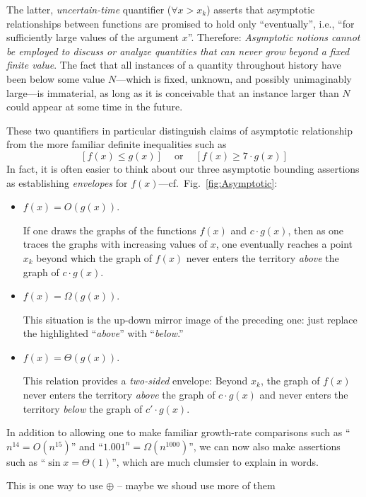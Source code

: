 \smallskip

The latter, {\em uncertain-time} quantifier ($\forall x > x_k$) asserts that asymptotic relationships between functions are promised to hold only ``eventually'', i.e., ``for sufficiently large values of the argument $x$''.  Therefore:  {\em Asymptotic notions cannot be employed to discuss or analyze quantities that can never grow beyond a fixed finite value}.  The fact that all instances of a quantity throughout history have been below some value $N$---which is fixed, unknown, and possibly unimaginably large---is immaterial, as long as it is conceivable that an instance larger than $N$ could appear at some time in the future.

\smallskip

These two quantifiers in particular distinguish claims of asymptotic relationship from the more familiar definite inequalities such as
\[ [f(x) \leq g(x)] \ \ \ \ \mbox{ or } \ \ \ \ [f(x) \geq 7 \cdot g(x)] \]
In fact, it is often easier to think about our three asymptotic bounding assertions as establishing {\em envelopes} for $f(x)$---cf.~Fig.~\ref{fig:Asymptotic}:
\begin{itemize}
\item
$f(x) = O(g(x))$.

If one draws the graphs of the functions $f(x)$ and $c \cdot g(x)$, then as one traces the graphs with increasing values of $x$, one eventually reaches a point $x_k$ beyond which the graph of $f(x)$ never enters the territory {\em above} the graph of $c \cdot g(x)$.
\medskip\item
$f(x) = \Omega(g(x))$.

This situation is the up-down mirror image of the preceding one: just replace the highlighted ``{\em above}'' with ``{\em below}.''
\medskip\item
$f(x) = \Theta(g(x))$.

This relation provides a {\em two-sided} envelope:  Beyond $x_k$, the graph of $f(x)$ never enters the territory {\em above} the graph of $c \cdot g(x)$ and never enters the territory
{\em below} the graph of $c' \cdot g(x)$.
\end{itemize}
In addition to allowing one to make familiar growth-rate comparisons such as ``$n^{14} = O(n^{15})$'' and ``$1.001^n = \Omega(n^{1000})$'', we can now also make assertions such as ``$\sin x = \Theta(1)$'', which are much clumsier to explain in words.

\medskip

{\Arny This is one way to use $\oplus$ -- maybe we shoud use more of them}

